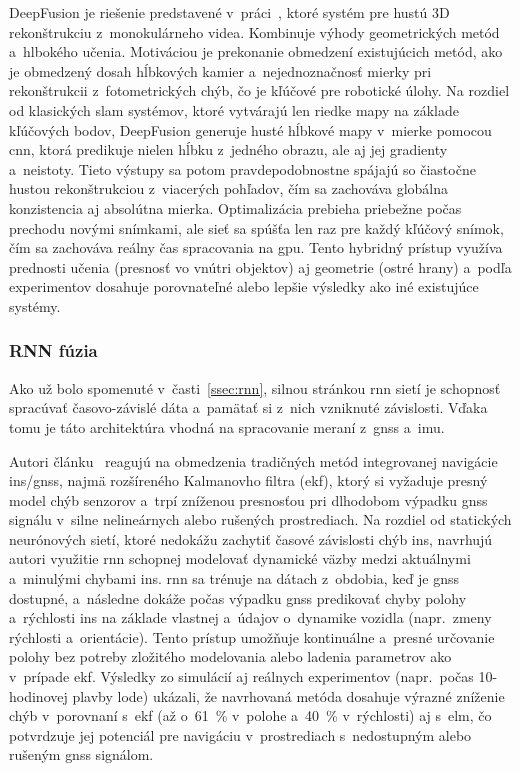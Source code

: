 
    DeepFusion je riešenie predstavené v~práci~\cite{laidlowDeepFusionRealTimeDense2022}, ktoré systém pre hustú 3D rekonštrukciu z~monokulárneho videa. Kombinuje výhody geometrických metód a~hlbokého učenia. Motiváciou je prekonanie obmedzení existujúcich metód, ako je obmedzený dosah hĺbkových kamier a~nejednoznačnosť mierky pri rekonštrukcii z~fotometrických chýb, čo je kľúčové pre robotické úlohy. Na rozdiel od klasických \acrshort{slam} systémov, ktoré vytvárajú len riedke mapy na základe kľúčových bodov, DeepFusion generuje husté hĺbkové mapy v~mierke pomocou \acrshort{cnn}, ktorá predikuje nielen hĺbku z~jedného obrazu, ale aj jej gradienty a~neistoty. Tieto výstupy sa potom pravdepodobnostne spájajú so čiastočne hustou rekonštrukciou z~viacerých pohľadov, čím sa zachováva globálna konzistencia aj absolútna mierka. Optimalizácia prebieha priebežne počas prechodu novými snímkami, ale sieť sa spúšťa len raz pre každý kľúčový snímok, čím sa zachováva reálny čas spracovania na \acrshort{gpu}. Tento hybridný prístup využíva prednosti učenia (presnosť vo vnútri objektov) aj geometrie (ostré hrany) a~podľa experimentov dosahuje porovnateľné alebo lepšie výsledky ako iné existujúce systémy.
  
  \subsubsection{RNN fúzia}

    Ako už bolo spomenuté v~časti~\ref{ssec:rnn}, silnou stránkou \acrshort{rnn} sietí je schopnosť spracúvať časovo-závislé dáta a~pamätať si z~nich vzniknuté závislosti. Vďaka tomu je táto architektúra vhodná na spracovanie meraní z~\acrshort{gnss} a~\acrshort{imu}. 

    Autori článku~\cite{daiINSGNSSIntegrated2020} reagujú na obmedzenia tradičných metód integrovanej navigácie \acrshort{ins}/\acrshort{gnss}, najmä rozšíreného Kalmanovho filtra (\acrshort{ekf}), ktorý si vyžaduje presný model chýb senzorov a~trpí zníženou presnosťou pri dlhodobom výpadku \acrshort{gnss} signálu v~silne nelineárnych alebo rušených prostrediach. Na rozdiel od statických neurónových sietí, ktoré nedokážu zachytiť časové závislosti chýb \acrshort{ins}, navrhujú autori využitie \acrshort{rnn} schopnej modelovať dynamické väzby medzi aktuálnymi a~minulými chybami \acrshort{ins}\@. \acrshort{rnn} sa trénuje na dátach z~obdobia, keď je \acrshort{gnss} dostupné, a~následne dokáže počas výpadku \acrshort{gnss} predikovať chyby polohy a~rýchlosti \acrshort{ins} na základe vlastnej  a~údajov o~dynamike vozidla (napr.\ zmeny rýchlosti a~orientácie). Tento prístup umožňuje kontinuálne a~presné určovanie polohy bez potreby zložitého modelovania alebo ladenia parametrov ako v~prípade \acrshort{ekf}. Výsledky zo simulácií aj reálnych experimentov (napr.\ počas 10-hodinovej plavby lode) ukázali, že navrhovaná metóda dosahuje výrazné zníženie chýb v~porovnaní s~\acrshort{ekf} (až o~61~\% v~polohe a~40~\% v~rýchlosti) aj s~\acrshort{elm}, čo potvrdzuje jej potenciál pre navigáciu v~prostrediach s~nedostupným alebo rušeným \acrshort{gnss} signálom.

